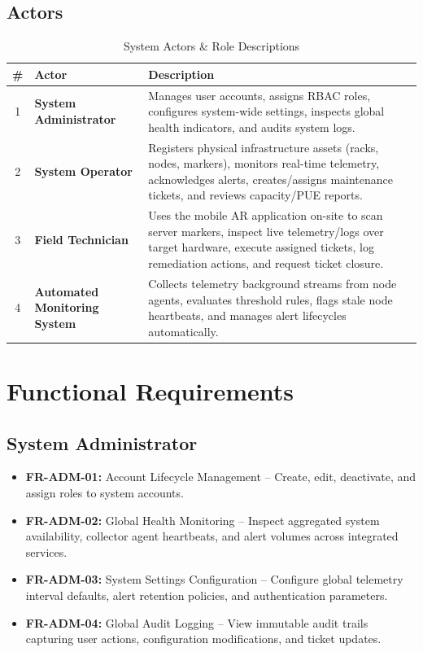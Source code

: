 \subsection{Actors}
\begin{table}[H]
    \centering
    \caption{System Actors \& Role Descriptions}
    \begin{tabular}{|c|l|p{10cm}|}
        \hline
        \textbf{\#} & \textbf{Actor} & \textbf{Description} \\ \hline
        1 & \textbf{System Administrator} & Manages user accounts, assigns RBAC roles, configures system-wide settings, inspects global health indicators, and audits system logs. \\ \hline
        2 & \textbf{System Operator} & Registers physical infrastructure assets (racks, nodes, markers), monitors real-time telemetry, acknowledges alerts, creates/assigns maintenance tickets, and reviews capacity/PUE reports. \\ \hline
        3 & \textbf{Field Technician} & Uses the mobile AR application on-site to scan server markers, inspect live telemetry/logs over target hardware, execute assigned tickets, log remediation actions, and request ticket closure. \\ \hline
        4 & \textbf{Automated Monitoring System} & Collects telemetry background streams from node agents, evaluates threshold rules, flags stale node heartbeats, and manages alert lifecycles automatically. \\ \hline
    \end{tabular}
\end{table}

\section{Functional Requirements}

\subsection{System Administrator}
\begin{itemize}
    \item \textbf{FR-ADM-01:} Account Lifecycle Management -- Create, edit, deactivate, and assign roles to system accounts.
    \item \textbf{FR-ADM-02:} Global Health Monitoring -- Inspect aggregated system availability, collector agent heartbeats, and alert volumes across integrated services.
    \item \textbf{FR-ADM-03:} System Settings Configuration -- Configure global telemetry interval defaults, alert retention policies, and authentication parameters.
    \item \textbf{FR-ADM-04:} Global Audit Logging -- View immutable audit trails capturing user actions, configuration modifications, and ticket updates.
\end{itemize}

